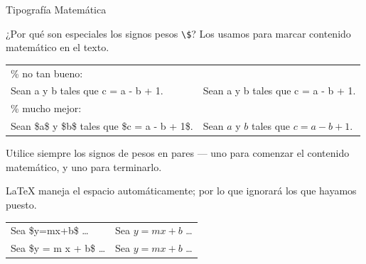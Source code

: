 \documentclass[12pt]{beamer}
\begin{document}
\begin{frame}{Tipografía Matemática}
  \begin{itemize}\small{
    \item<1-> ¿Por qué son especiales los signos pesos \texttt{\textbackslash \$}? Los
    usamos para marcar contenido  matemático en el texto.\\[1ex]    
    \begin{tabular}{|p{5cm}|p{5cm}|}\hline
\color{green}\% no tan bueno: & \\
Sean a y b tales que c = a - b + 1.&Sean a y b tales que c = a - b + 1.\\
\color{green}\% mucho mejor: & \\
Sean \$a\$ y \$b\$ tales que \$c = a - b + 1\$. &
Sean $a$ y $b$ tales que $c = a - b + 1$.\\\hline
    \end{tabular}
  \item Utilice siempre los signos de pesos en pares --- uno para
    comenzar el contenido matemático, y uno para terminarlo.
  \item \LaTeX{} maneja el espacio automáticamente; por lo que
    ignorará los que hayamos puesto.\\[1ex]
    \begin{center}    
    \begin{tabular}{|l|l|}\hline
Sea \$y=mx+b\$ \ldots & Sea $y=mx+b$ \ldots\\[5pt]      
Sea \$y = m x + b\$ \ldots & Sea $y = m x + b$ \ldots\\\hline
    \end{tabular}
    \end{center}}
  \end{itemize}
\end{frame}
\end{document}
